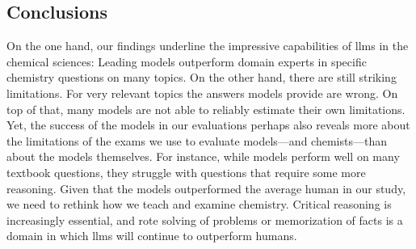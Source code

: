 \documentclass[11pt, oneside]{article}
\begin{document}
\begin{refsection}

\section{Conclusions}
On the one hand, our findings underline the impressive capabilities of \glspl{llm} in the chemical sciences: Leading models outperform domain experts in specific chemistry questions on many topics. 
On the other hand, there are still striking limitations. 
For very relevant topics the answers models provide are wrong. 
On top of that, many models are not able to reliably estimate their own limitations.
Yet, the success of the models in our evaluations perhaps also reveals more about the limitations of the exams we use to evaluate models---and chemists---than about the models themselves.
For instance, while models perform well on many textbook questions, they struggle with questions that require some more reasoning. 
Given that the models outperformed the average human in our study, we need to rethink how we teach and examine chemistry.
Critical reasoning is increasingly essential, and rote solving of problems or memorization of facts is a domain in which \glspl{llm} will continue to outperform humans.


\end{refsection}
\end{document}
